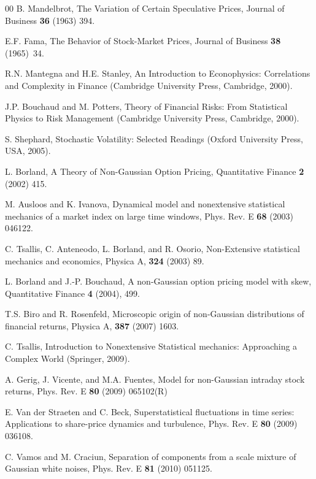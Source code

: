\documentclass[preprint,12pt]{elsarticle}
\theoremstyle{definition}
\theoremstyle{remark}
\numberwithin{equation}{section}
\theoremstyle{definition}
\begin{document}
\begin{thebibliography}{00}
 B. Mandelbrot, The Variation of Certain Speculative Prices, Journal of Business  \textbf{36} (1963) 394.

   E.F. Fama, The Behavior of Stock-Market Prices, Journal of Business \textbf{38} (1965)~34.



   R.N. Mantegna and H.E. Stanley, An Introduction to Econophysics: Correlations and Complexity in Finance  (Cambridge University Press, Cambridge,  2000).

   J.P. Bouchaud and M. Potters, Theory of Financial Risks: From Statistical Physics to Risk Management (Cambridge University Press, Cambridge,  2000).

  S. Shephard, Stochastic Volatility: Selected Readings (Oxford University Press, USA, 2005).

  L. Borland, A Theory of Non-Gaussian Option Pricing, Quantitative Finance \textbf{2} (2002) 415.

  M. Ausloos and K. Ivanova, Dynamical model and nonextensive statistical mechanics of a market index on large time windows, Phys. Rev. E \textbf{68} (2003) 046122.

  C. Tsallis, C. Anteneodo, L. Borland, and R. Osorio, Non-Extensive statistical mechanics and economics, Physica A, \textbf{324} (2003) 89.

 L. Borland and J.-P. Bouchaud, A non-Gaussian option pricing model with skew, Quantitative Finance \textbf{4} (2004), 499.

  T.S. Biro and R. Rosenfeld, Microscopic origin of non-Gaussian distributions of financial returns, Physica A, \textbf{387} (2007) 1603.

   C. Tsallis, Introduction to Nonextensive Statistical mechanics: Approaching a Complex World (Springer, 2009).

  A. Gerig, J. Vicente, and M.A. Fuentes, Model for non-Gaussian intraday stock returns, Phys. Rev. E  \textbf{80} (2009) 065102(R)

   E. Van der Straeten and C. Beck, Superstatistical fluctuations in time series: Applications to share-price dynamics and turbulence, Phys. Rev. E  \textbf{80} (2009) 036108.

   C. Vamos and M. Craciun, Separation of components from a scale mixture of Gaussian white noises, Phys. Rev. E  \textbf{81} (2010) 051125.


\end{thebibliography}
\end{document}
